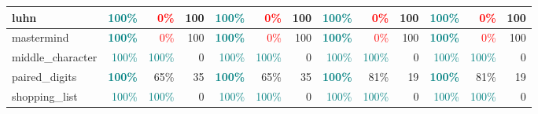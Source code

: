 \begin{table}[!h]
{\begin{tabular}{|p{2.9cm}|rr|r|rr|r||rr|r|rr|r|}
		luhn               & \textcolor{teal}{\textbf{100\%}} & \multicolumn{1}{r|}{\textcolor{red}{0\%}}             & \cellcolor[HTML]{FF9900}100 & \textcolor{teal}{\textbf{100\%}} & \multicolumn{1}{r|}{\textcolor{red}{0\%}}             & \cellcolor[HTML]{FF9900}100 & \textcolor{teal}{\textbf{100\%}}     & \multicolumn{1}{r|}{\textcolor{red}{0\%}}    & \cellcolor[HTML]{FF9900}100  & \textcolor{teal}{\textbf{100\%}} & \multicolumn{1}{r|}{\textcolor{red}{0\%}}             & \cellcolor[HTML]{FF9900}100  \\ \hline
		mastermind         & \textcolor{teal}{\textbf{100\%}} & \multicolumn{1}{r|}{\textcolor{red}{0\%}}             & \cellcolor[HTML]{FF9900}100 & \textcolor{teal}{\textbf{100\%}} & \multicolumn{1}{r|}{\textcolor{red}{0\%}}             & \cellcolor[HTML]{FF9900}100 & \textcolor{teal}{\textbf{100\%}}     & \multicolumn{1}{r|}{\textcolor{red}{0\%}}    & \cellcolor[HTML]{FF9900}100  & \textcolor{teal}{\textbf{100\%}} & \multicolumn{1}{r|}{\textcolor{red}{0\%}}             & \cellcolor[HTML]{FF9900}100  \\ \hline
		middle\_character  & \textcolor{teal}{100\%}          & \multicolumn{1}{r|}{\textcolor{teal}{100\%}}          & \cellcolor[HTML]{FFFFFF}0   & \textcolor{teal}{100\%}          & \multicolumn{1}{r|}{\textcolor{teal}{100\%}}          & \cellcolor[HTML]{FFFFFF}0   & \textcolor{teal}{100\%}     & \multicolumn{1}{r|}{\textcolor{teal}{100\%}} & \cellcolor[HTML]{FFFFFF}0    & \textcolor{teal}{100\%}          & \multicolumn{1}{r|}{\textcolor{teal}{100\%}}          & \cellcolor[HTML]{FFFFFF}0    \\ \hline
		paired\_digits     & \textcolor{teal}{\textbf{100\%}} & \multicolumn{1}{r|}{65\%}                             & \cellcolor[HTML]{FFDCA6}35  & \textcolor{teal}{\textbf{100\%}} & \multicolumn{1}{r|}{65\%}                             & \cellcolor[HTML]{FFDCA6}35  & \textcolor{teal}{\textbf{100\%}}     & \multicolumn{1}{r|}{81\%}                    & \cellcolor[HTML]{FFECCF}19   & \textcolor{teal}{\textbf{100\%}} & \multicolumn{1}{r|}{81\%}                             & \cellcolor[HTML]{FFECCF}19   \\ \hline
		shopping\_list     & \textcolor{teal}{100\%}          & \multicolumn{1}{r|}{\textcolor{teal}{100\%}}          & \cellcolor[HTML]{FFFFFF}0   & \textcolor{teal}{100\%}          & \multicolumn{1}{r|}{\textcolor{teal}{100\%}}          & \cellcolor[HTML]{FFFFFF}0   & \textcolor{teal}{100\%}     & \multicolumn{1}{r|}{\textcolor{teal}{100\%}} & \cellcolor[HTML]{FFFFFF}0    & \textcolor{teal}{100\%}          & \multicolumn{1}{r|}{\textcolor{teal}{100\%}}          & \cellcolor[HTML]{FFFFFF}0    \\ \hline

\end{tabular}}
\end{table}
